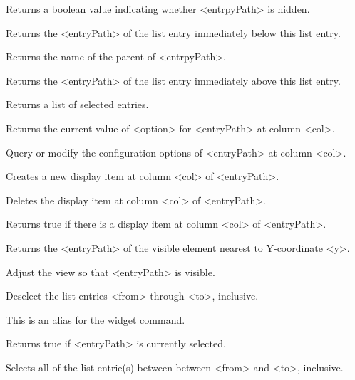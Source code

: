 \begin{enum}{1cm}
Returns a boolean value indicating whether <entrpyPath> is hidden. 

Returns the <entryPath> of the list entry immediately below this list entry.

Returns the name of the parent of <entrpyPath>.

Returns the <entryPath> of the list entry immediately above this list entry.

Returns a list of selected entries.

Returns the current value of <option> for <entryPath> at column <col>.

Query or modify the configuration options of <entryPath> at column <col>.

Creates a new display item at column <col> of <entryPath>.

Deletes the display item at column <col> of <entryPath>.

Returns true if there is a display item at column <col> of <entryPath>.

Returns the <entryPath> of the visible element nearest to Y-coordinate <y>.

Adjust the view so that <entryPath> is visible.

Deselect the list entries <from> through <to>, inclusive.

This is an alias for the  widget command.

Returns true if <entryPath> is currently selected.

Selects all of the list entrie(s) between between <from> and <to>, inclusive.


\end{enum}
